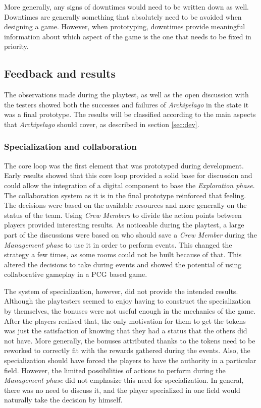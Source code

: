 More generally, any signs of downtimes would need to be written down as well. Downtimes are generally something that absolutely need to be avoided when designing a game. However, when prototyping, downtimes provide meaningful information about which aspect of the game is the one that needs to be fixed in priority.
\subsection{Feedback and results}
The observations made during the playtest, as well as the open discussion with the testers showed both the successes and failures of \textit{Archipelago} in the state it was a final prototype. The results will be classified according to the main aspects that \textit{Archipelago} should cover, as described in section \ref{sec:dev}.

\subsubsection{Specialization and collaboration}
The core loop was the first element that was prototyped during development. Early results showed that this core loop provided a solid base for discussion and could allow the integration of a digital component to base the \textit{Exploration phase}. The collaboration system as it is in the final prototype reinforced that feeling. The decisions were based on the available resources and more generally on the status of the team. Using \textit{Crew Members} to divide the action points between players provided interesting results. As noticeable during the playtest, a large part of the discussions were based on who should save a \textit{Crew Member} during the \textit{Management phase} to use it in order to perform events. This changed the strategy a few times, as some rooms could not be built because of that. This altered the decisions to take during events and showed the potential of using collaborative gameplay in a PCG based game.

The system of specialization, however, did not provide the intended results. Although the playtesters seemed to enjoy having to construct the specialization by themselves, the bonuses were not useful enough in the mechanics of the game. After the players realised that, the only motivation for them to get the tokens was just the satisfaction of knowing that they had a status that the others did not have. More generally, the bonuses attributed thanks to the tokens need to be reworked to correctly fit with the rewards gathered during the events. Also, the specialization should have forced the players to have the authority in a particular field. However, the limited possibilities of actions to perform during the \textit{Management phase} did not emphasize this need for specialization. In general, there was no need to discuss it, and the player specialized in one field would naturally take the decision by himself.

